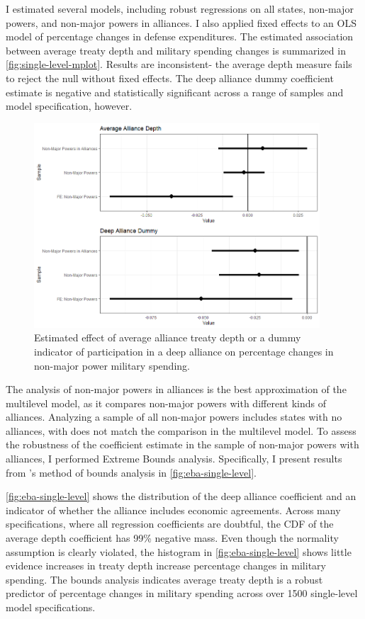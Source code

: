 \documentclass[12pt]{article}
\begin{document}
I estimated several models, including robust regressions on all states, non-major powers, and non-major powers in alliances. 
I also applied fixed effects to an OLS model of percentage changes in defense expenditures. 
The estimated association between average treaty depth and military spending changes is summarized in \autoref{fig:single-level-mplot}. 
Results are inconsistent- the average depth measure fails to reject the null without fixed effects. 
The deep alliance dummy coefficient estimate is negative and statistically significant across a range of samples and model specification, however. 

\begin{figure}[htbp]
	\centering
		\includegraphics[width=0.95\textwidth]{single-level-mplot.png}
	\caption{Estimated effect of average alliance treaty depth or a dummy indicator of participation in a deep alliance on percentage changes in non-major power military spending.}
	\label{fig:single-level-mplot}
\end{figure}


The analysis of non-major powers in alliances is the best approximation of the multilevel model, as it compares non-major powers with different kinds of alliances. 
Analyzing a sample of all non-major powers includes states with no alliances, with does not match the comparison in the multilevel model. 
To assess the robustness of the coefficient estimate in the sample of non-major powers with alliances, I performed Extreme Bounds analysis. 
Specifically, I present results from \citet{Sala-i-Martin1997}'s method of bounds analysis in \autoref{fig:eba-single-level}. 


\autoref{fig:eba-single-level} shows the distribution of the deep alliance coefficient and an indicator of whether the alliance includes economic agreements. 
Across many specifications, where all regression coefficients are doubtful, the CDF of the average depth coefficient has 99\% negative mass. 
Even though the normality assumption is clearly violated, the histogram in \autoref{fig:eba-single-level} shows little evidence increases in treaty depth increase percentage changes in military spending. 
The bounds analysis indicates average treaty depth is a robust predictor of percentage changes in military spending across over 1500 single-level model specifications. 
\end{document}
